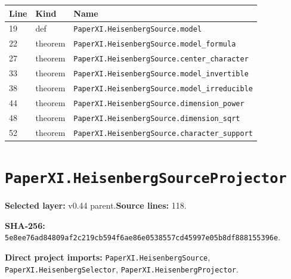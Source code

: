 \documentclass[10pt,oneside]{book}
\begin{document}
\begin{longtable}{@{}p{}p{}p{}@{}}\toprule Line&Kind&Name\\\midrule\endhead

19&def&\nolinkurl{PaperXI.HeisenbergSource.model}\\

22&theorem&\nolinkurl{PaperXI.HeisenbergSource.model_formula}\\

27&theorem&\nolinkurl{PaperXI.HeisenbergSource.center_character}\\

33&theorem&\nolinkurl{PaperXI.HeisenbergSource.model_invertible}\\

38&theorem&\nolinkurl{PaperXI.HeisenbergSource.model_irreducible}\\

44&theorem&\nolinkurl{PaperXI.HeisenbergSource.dimension_power}\\

48&theorem&\nolinkurl{PaperXI.HeisenbergSource.dimension_sqrt}\\

52&theorem&\nolinkurl{PaperXI.HeisenbergSource.character_support}\\

\bottomrule\end{longtable}

\section{\texorpdfstring{\nolinkurl{PaperXI.HeisenbergSourceProjector}}{PaperXI.HeisenbergSourceProjector}}\label{module:PaperXI.HeisenbergSourceProjector}

\textbf{Selected layer:} v0.44 parent.\quad\textbf{Source lines:} 118.\par\textbf{SHA-256:} {\scriptsize\nolinkurl{5e8ee76ad84809af2c219cb594f6ae86e0538557cd45997e05b8df888155396e}}.


\textbf{Direct project imports:} \nolinkurl{PaperXI.HeisenbergSource}, \nolinkurl{PaperXI.HeisenbergSelector}, \nolinkurl{PaperXI.HeisenbergProjector}.
\end{document}
